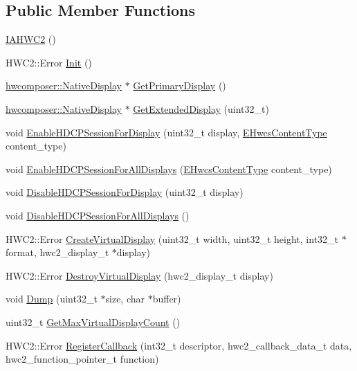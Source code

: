 \subsection*{Public Member Functions}
\begin{DoxyCompactItemize}
\item 
\mbox{\hyperlink{classandroid_1_1IAHWC2_ae360eef66e03be710114293b9988c8a4}{I\+A\+H\+W\+C2}} ()
\item 
H\+W\+C2\+::\+Error \mbox{\hyperlink{classandroid_1_1IAHWC2_a3661dacf6f3f03be404f9dfcfdeb00a9}{Init}} ()
\item 
\mbox{\hyperlink{classhwcomposer_1_1NativeDisplay}{hwcomposer\+::\+Native\+Display}} $\ast$ \mbox{\hyperlink{classandroid_1_1IAHWC2_a2ccc293910577a09cfe0a0f6c1f786ea}{Get\+Primary\+Display}} ()
\item 
\mbox{\hyperlink{classhwcomposer_1_1NativeDisplay}{hwcomposer\+::\+Native\+Display}} $\ast$ \mbox{\hyperlink{classandroid_1_1IAHWC2_a9b5b98f12f0580b5d328e6fc6b1465dc}{Get\+Extended\+Display}} (uint32\+\_\+t)
\item 
void \mbox{\hyperlink{classandroid_1_1IAHWC2_a473d60e8aa343e77381a6e0b04d18a23}{Enable\+H\+D\+C\+P\+Session\+For\+Display}} (uint32\+\_\+t display, \mbox{\hyperlink{hwcserviceapi_8h_a69e9b3a54e4c8e504845398c66eab655}{E\+Hwcs\+Content\+Type}} content\+\_\+type)
\item 
void \mbox{\hyperlink{classandroid_1_1IAHWC2_aafac4b9c0d47342441cb104b9df8b52c}{Enable\+H\+D\+C\+P\+Session\+For\+All\+Displays}} (\mbox{\hyperlink{hwcserviceapi_8h_a69e9b3a54e4c8e504845398c66eab655}{E\+Hwcs\+Content\+Type}} content\+\_\+type)
\item 
void \mbox{\hyperlink{classandroid_1_1IAHWC2_aaf25b167aeb33efb991f4872f421061f}{Disable\+H\+D\+C\+P\+Session\+For\+Display}} (uint32\+\_\+t display)
\item 
void \mbox{\hyperlink{classandroid_1_1IAHWC2_aab6e5e72a11dea3b84889e7df3ca76ee}{Disable\+H\+D\+C\+P\+Session\+For\+All\+Displays}} ()
\item 
H\+W\+C2\+::\+Error \mbox{\hyperlink{classandroid_1_1IAHWC2_a54263b4dff8e34603246c9ddb5b4f8a1}{Create\+Virtual\+Display}} (uint32\+\_\+t width, uint32\+\_\+t height, int32\+\_\+t $\ast$format, hwc2\+\_\+display\+\_\+t $\ast$display)
\item 
H\+W\+C2\+::\+Error \mbox{\hyperlink{classandroid_1_1IAHWC2_a25898776b812d1d34e309aa4348b191e}{Destroy\+Virtual\+Display}} (hwc2\+\_\+display\+\_\+t display)
\item 
void \mbox{\hyperlink{classandroid_1_1IAHWC2_a09a0fe32d95d6d75613458a906b8e4c5}{Dump}} (uint32\+\_\+t $\ast$size, char $\ast$buffer)
\item 
uint32\+\_\+t \mbox{\hyperlink{classandroid_1_1IAHWC2_a0be35c4807be335ebe48af20f66b9bdd}{Get\+Max\+Virtual\+Display\+Count}} ()
\item 
H\+W\+C2\+::\+Error \mbox{\hyperlink{classandroid_1_1IAHWC2_aa31f7c1a1085b8f3e65efc7dcdac957e}{Register\+Callback}} (int32\+\_\+t descriptor, hwc2\+\_\+callback\+\_\+data\+\_\+t data, hwc2\+\_\+function\+\_\+pointer\+\_\+t function)
\end{DoxyCompactItemize}

